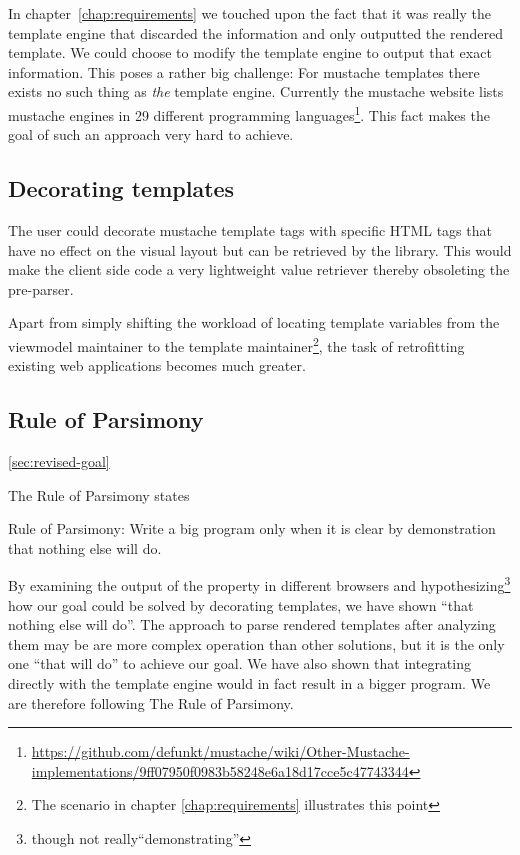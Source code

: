 \documentclass[thesis.tex]{subfiles}
\begin{document}
In chapter~\ref{chap:requirements} we touched upon the fact that it was really
the template engine that discarded the information and only outputted the
rendered template. We could choose to modify the template engine to output that
exact information. This poses a rather big challenge:
For mustache templates there exists no such thing as \emph{the} template engine.
Currently the mustache website lists mustache engines in 29 different
programming languages\footnote{
      \url{https://github.com/defunkt/mustache/wiki/Other-Mustache-implementations/9ff07950f0983b58248e6a18d17cce5c47743344}
}.
This fact makes the goal of such an approach very hard to achieve.

\subsection{Decorating templates}

The user could decorate mustache template tags with specific HTML tags that
have no effect on the visual layout but can be retrieved by the library.
This would make the client side code a very lightweight value retriever
thereby obsoleting the pre-parser.

Apart from simply shifting the workload of locating template variables
from the viewmodel maintainer to the template maintainer\footnote{The scenario
in chapter \ref{chap:requirements} illustrates this point},
the task of retrofitting existing web applications becomes much greater.

\subsection{Rule of Parsimony}
\ref{sec:revised-goal}

The Rule of Parsimony states
\begin{citequote}{\cite[Chapter 1]{UXART}}
Rule of Parsimony: Write a big program only when it is clear by demonstration
that nothing else will do.
\end{citequote}

By examining the output of the  property in different browsers
and hypothesizing\footnote{though not really``demonstrating''} how our goal
could be solved by decorating templates, we have shown ``that nothing else will
do''. The approach to parse rendered templates after analyzing them may be are
more complex operation than other solutions, but it is the only one
``that will do'' to achieve our goal. We have also shown that integrating
directly with the template engine would in fact result in a bigger program.
We are therefore following The Rule of Parsimony.
\end{document}
